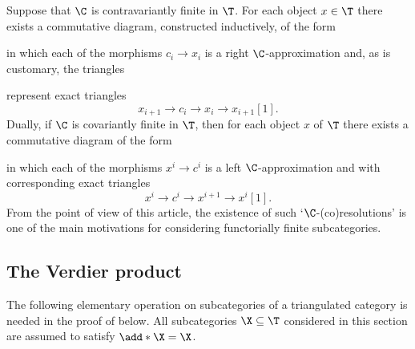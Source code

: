 \documentclass[a4paper]{amsart}
\begin{document}
\begin{remark}
  Suppose that $\C$ is contravariantly finite in $\T$. For each object $x\in\T$
  there exists a commutative diagram, constructed inductively, of the form
  \begin{center}
  \end{center}
  in which each of the morphisms $c_i\to x_i$ is a right $\C$-approximation and,
  as is customary, the triangles
  \begin{center}
  \end{center}
  represent exact triangles
  \[
    x_{i+1}\longrightarrow c_i\longrightarrow x_i\longrightarrow x_{i+1}[1].
  \]
  Dually, if $\C$ is covariantly finite in $\T$, then for each object $x$ of
  $\T$ there exists a commutative diagram of the form
  \begin{center}
  \end{center}
  in which each of the morphisms $x^i\to c^i$ is a left $\C$-approximation and
  with corresponding exact triangles
  \[
    x^i\longrightarrow c^i\longrightarrow x^{i+1}\longrightarrow x^i[1].
  \]
  From the point of view of this article, the existence of such
  `$\C$-(co)resolutions' is one of the main motivations for considering
  functorially finite subcategories.
\end{remark}

\subsection{The Verdier product}

The following elementary operation on subcategories of a triangulated category
is needed in the proof of  below. All
subcategories $\X\subseteq\T$ considered in this section are assumed to satisfy $\add*{\X}=\X$.
\end{document}
